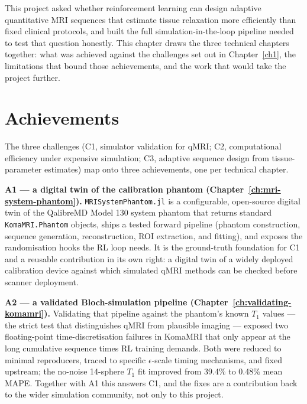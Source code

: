 \label{Conclusions}

This project asked whether reinforcement learning can design adaptive
quantitative MRI sequences that estimate tissue relaxation more efficiently
than fixed clinical protocols, and built the full simulation-in-the-loop
pipeline needed to test that question honestly. This chapter draws the three
technical chapters together: what was achieved against the challenges set out
in Chapter~\ref{ch1}, the limitations that bound those achievements, and the
work that would take the project further.

\section{Achievements}
\label{sec:concl-achievements}

The three challenges (C1, simulator validation for qMRI; C2, computational
efficiency under expensive simulation; C3, adaptive sequence design from
tissue-parameter estimates) map onto three achievements, one per technical
chapter.

\textbf{A1 --- a digital twin of the calibration phantom
(Chapter~\ref{ch:mri-system-phantom}).} \texttt{MRISystemPhantom.jl} is a
configurable, open-source digital twin of the QalibreMD Model 130 system
phantom that returns standard \texttt{KomaMRI.Phantom} objects, ships a
tested forward pipeline (phantom construction, sequence generation,
reconstruction, ROI extraction, and fitting), and exposes the randomisation
hooks the RL loop needs. It is the ground-truth foundation for C1 and a
reusable contribution in its own right: a digital twin of a widely deployed
calibration device against which simulated qMRI methods can be checked
before scanner deployment.

\textbf{A2 --- a validated Bloch-simulation pipeline
(Chapter~\ref{ch:validating-komamri}).} Validating that pipeline against the
phantom's known $T_1$ values --- the strict test that distinguishes qMRI from
plausible imaging --- exposed two floating-point time-discretisation failures
in KomaMRI that only appear at the long cumulative sequence times RL training
demands. Both were reduced to minimal reproducers, traced to specific
$\epsilon$-scale timing mechanisms, and fixed upstream; the no-noise
14-sphere $T_1$ fit improved from 39.4\% to 0.48\% mean MAPE. Together with
A1 this answers C1, and the fixes are a contribution back to the wider
simulation community, not only to this project.

